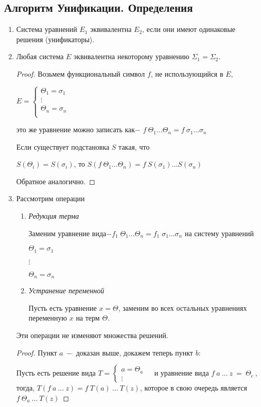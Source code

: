 		\subsection{Алгоритм Унификации. Определения}
		\begin{enumerate}
			\item Система уравнений $E_1$ эквивалентна $E_2$, если они имеют одинаковые решения (унификаторы).
			\item Любая система $E$ эквивалентна некоторому уравнению $\Sigma_1=\Sigma_2$.

	\begin{proof}
		Возьмем функциональный символ $f$, не использующийся в $E$, \par
		$
		E=\begin{cases}
			\Theta_1=\sigma_1&\\
			\vdots&\\
			\Theta_n=\sigma_n&\\
		\end{cases}
		$\par
		это же уравнение можно записать как$-$ $f\:\Theta_1\hdots\Theta_n=f\:\sigma_1 \hdots\sigma_n$\par
		Если существует подстановка $S$ такая, что\par $S(\Theta_i)=S(\sigma_i)$,
		то $S(f\:\Theta_1\hdots\Theta_n)=f\:S(\sigma_1)\hdots S(\sigma_n)$ \par Обратное аналогично.\end{proof}
		\item Рассмотрим операции
		\begin{enumerate}
			\item \textit{Редукция терма} \par
					Заменим уравнение вида$-f_1\;\Theta_1 \hdots\Theta_n=f_1\;\sigma_1\hdots\sigma_n$ на систему уравнений\par$\Theta_1=\sigma_1$\par$\vdots$\par$\Theta_n=\sigma_n$
			\item \textit{Устранение переменной} \par
			Пусть есть уравнение $x=\Theta$, заменим во всех остальных уравнениях переменную $x$ на терм $\Theta$.
		\end{enumerate}
		\begin{statement} Эти операции не изменяют множества решений.
		\end{statement}
		\begin{proof} Пункт $a\:-$ доказан выше, докажем теперь пункт $b:$\par Пусть есть решение вида $T = \begin{cases} a = \Theta_a &\\ \vdots \end{cases}$
		и уравнение вида $f\:a\:\hdots\:z\:=\:\Theta_c\:$, тогда, $T(f\:a\:\hdots\:z) = f\:T(a)\:\hdots\:T(z)$, которое в свою очередь является $f\: \Theta_a\:\hdots\:T(z)$
		\end{proof}
	\end{enumerate}	
